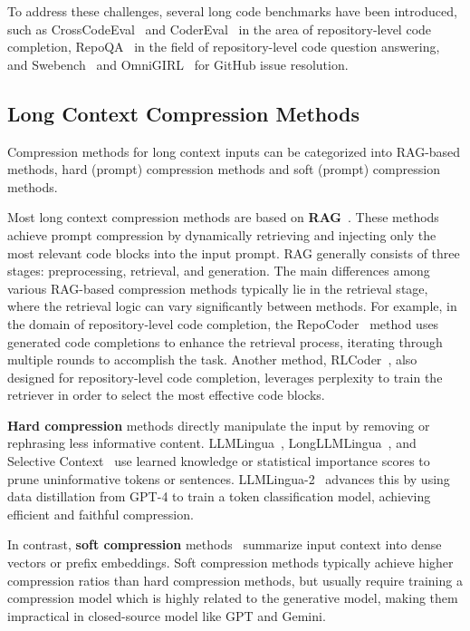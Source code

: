 To address these challenges, several long code benchmarks have been introduced, 
such as CrossCodeEval~\cite{ding2023crosscodeeval} and CoderEval~\cite{Yu2023CoderEvalAB} in the area of repository-level code completion, RepoQA~\cite{liu2024repoqaevaluatinglongcontext} in the field of repository-level code question answering, and Swebench~\cite{jimenez2023swe} and OmniGIRL~\cite{guo2025omnigirlmultilingualmultimodalbenchmark} for GitHub issue resolution.

\subsection{Long Context Compression Methods}
Compression methods for long context inputs can be categorized into RAG-based methods, hard (prompt) compression methods and soft (prompt) compression methods.

Most long context compression methods are based on \textbf{RAG}~\cite{parvez2021retrievalaugmentedcodegeneration}. These methods achieve prompt compression by dynamically retrieving and injecting only the most relevant code blocks into the input prompt. 
RAG generally consists of three stages: preprocessing, retrieval, and generation. The main differences among various RAG-based compression methods typically lie in the retrieval stage, where the retrieval logic can vary significantly between methods.
For example, in the domain of repository-level code completion, the RepoCoder~\cite{zhang2023repocoder} method uses generated code completions to enhance the retrieval process, iterating through multiple rounds to accomplish the task. 
Another method, RLCoder~\cite{wang2024rlcoder}, also designed for repository-level code completion, leverages perplexity to train the retriever in order to select the most effective code blocks.

\textbf{Hard compression} methods directly manipulate the input by removing or rephrasing less informative content. LLMLingua~\cite{jiang2023llmlingua}, LongLLMLingua~\cite{jiang2023longllmlingua}, and Selective Context~\cite{li-etal-2023-compressing} use learned knowledge or statistical importance scores to prune uninformative tokens or sentences. 
LLMLingua-2~\cite{pan2024llmlingua} advances this by using data distillation from GPT-4 to train a token classification model, achieving efficient and faithful compression.

In contrast, \textbf{soft compression} methods~\cite{chevalier2023adapting,mu2024learning,500xcompressor} summarize input context into dense vectors or prefix embeddings. Soft compression methods typically achieve higher compression ratios than hard compression methods, but usually require training a compression model which is highly related to the generative model, making them impractical in closed-source model like GPT and Gemini. 

